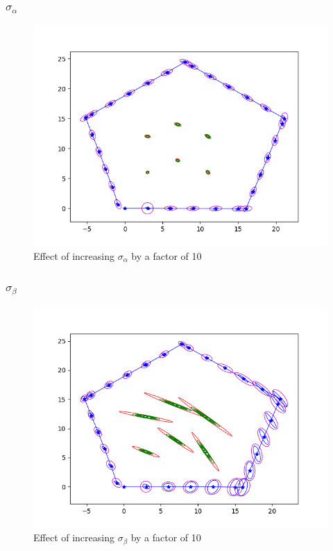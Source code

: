 \documentclass[12pt, a4paper]{article}
\begin{document}
\subsubsection{$\sigma_{\alpha}$}
\begin{figure}[H]
  \centering
  \includegraphics[width=1\textwidth]{./results/q3_2/result_alpha.png}
  \caption{Effect of increasing $\sigma_{\alpha}$ by a factor of 10}
\end{figure}
\subsubsection{$\sigma_{\beta}$}
\begin{figure}[H]
  \centering
  \includegraphics[width=1\textwidth]{./results/q3_2/result_beta.png}
  \caption{Effect of increasing $\sigma_{\beta}$ by a factor of 10}
\end{figure}
\end{document}

